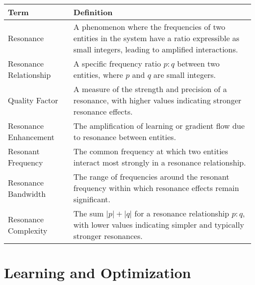 \begin{center}
\begin{tabular}{|l|p{12cm}|}
\hline
\textbf{Term} & \textbf{Definition} \\
\hline
Resonance & A phenomenon where the frequencies of two entities in the system have a ratio expressible as small integers, leading to amplified interactions. \\
\hline
Resonance Relationship & A specific frequency ratio $p:q$ between two entities, where $p$ and $q$ are small integers. \\
\hline
Quality Factor & A measure of the strength and precision of a resonance, with higher values indicating stronger resonance effects. \\
\hline
Resonance Enhancement & The amplification of learning or gradient flow due to resonance between entities. \\
\hline
Resonant Frequency & The common frequency at which two entities interact most strongly in a resonance relationship. \\
\hline
Resonance Bandwidth & The range of frequencies around the resonant frequency within which resonance effects remain significant. \\
\hline
Resonance Complexity & The sum $|p|+|q|$ for a resonance relationship $p:q$, with lower values indicating simpler and typically stronger resonances. \\
\hline
\end{tabular}
\label{tab:resonance_terminology}
\end{center}

\section{Learning and Optimization}

